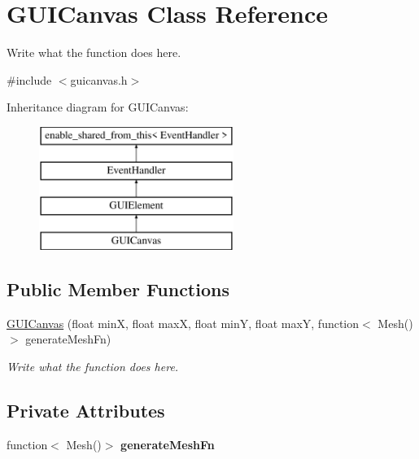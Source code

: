 \hypertarget{classGUICanvas}{\section{G\+U\+I\+Canvas Class Reference}
\label{classGUICanvas}
}


Write what the function does here.  




{\ttfamily \#include $<$guicanvas.\+h$>$}

Inheritance diagram for G\+U\+I\+Canvas\+:\begin{figure}[H]
\begin{center}
\leavevmode
\includegraphics[height=4.000000cm]{classGUICanvas}
\end{center}
\end{figure}
\subsection*{Public Member Functions}
\begin{DoxyCompactItemize}
\item 
\hyperlink{classGUICanvas_a2e6418e2376d80fddab7a747dd15da36}{G\+U\+I\+Canvas} (float min\+X, float max\+X, float min\+Y, float max\+Y, function$<$ Mesh()$>$ generate\+Mesh\+Fn)
\begin{DoxyCompactList}\small\item\em Write what the function does here. \end{DoxyCompactList}\end{DoxyCompactItemize}
\subsection*{Private Attributes}
\begin{DoxyCompactItemize}
\item 
\hypertarget{classGUICanvas_a3758be22090e23d9c7d566a5a08041d5}{function$<$ Mesh()$>$ {\bfseries generate\+Mesh\+Fn}}\label{classGUICanvas_a3758be22090e23d9c7d566a5a08041d5}

\end{DoxyCompactItemize}


